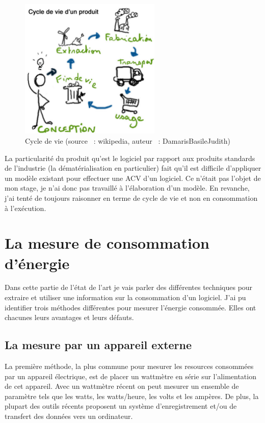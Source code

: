 \documentclass[a4paper, 11pt]{report}
\begin{document}
\begin{figure}
	\centering
	\includegraphics[width=0.6\textwidth]{figures/Cycle-de-vie}
	\caption{Cycle de vie (source ~: wikipedia, auteur ~: DamarisBasileJudith)}
	\label{CdV}
\end{figure}

La particularité du produit qu'est le logiciel par rapport aux produits standards de l'industrie (la dématérialisation en particulier) fait qu'il est difficile d'appliquer un modèle existant pour effectuer une ACV d'un logiciel. Ce n'était pas l'objet de mon stage, je n'ai donc pas travaillé à l'élaboration d'un modèle. En revanche, j'ai tenté de toujours raisonner en terme de cycle de vie et non en consommation à l'exécution.
			
		
	\section{La mesure de consommation d'énergie}
Dans cette partie de l'état de l'art je vais parler des différentes techniques pour extraire et utiliser une information sur la consommation d'un logiciel. J'ai pu identifier trois méthodes différentes pour mesurer l'énergie consommée. Elles ont chacunes leurs avantages et leurs défauts.
			\subsection{La mesure par un appareil externe}
La première méthode, la plus commune pour mesurer les resources consommées par un appareil électrique, est de placer un wattmètre en série sur l'alimentation de cet appareil. Avec un wattmètre récent on peut mesurer un ensemble de paramètre tels que les watts, les watts/heure, les volts et les ampères. De plus, la plupart des outils récents proposent un système d'enregistrement et/ou de transfert des données vers un ordinateur.
\end{document}
